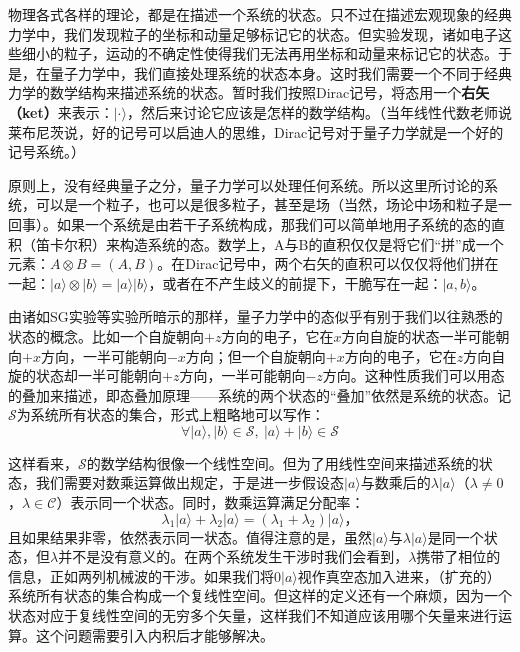 \documentclass{ctexart}
\begin{document}
物理各式各样的理论，都是在描述一个系统的状态。只不过在描述宏观现象的经典力学中，我们发现粒子的坐标和动量足够标记它的状态。但实验发现，诸如电子这些细小的粒子，运动的不确定性使得我们无法再用坐标和动量来标记它的状态。于是，在量子力学中，我们直接处理系统的状态本身。这时我们需要一个不同于经典力学的数学结构来描述系统的状态。暂时我们按照Dirac记号，将态用一个\textbf{右矢（ket）}来表示：$|\cdot\rangle$，然后来讨论它应该是怎样的数学结构。（当年线性代数老师说莱布尼茨说，好的记号可以启迪人的思维，Dirac记号对于量子力学就是一个好的记号系统。）

原则上，没有经典量子之分，量子力学可以处理任何系统。所以这里所讨论的系统，可以是一个粒子，也可以是很多粒子，甚至是场（当然，场论中场和粒子是一回事）。如果一个系统是由若干子系统构成，那我们可以简单地用子系统的态的直积（笛卡尔积）来构造系统的态。数学上，A与B的直积仅仅是将它们“拼”成一个元素：$A\otimes B=(A,B)$。在Dirac记号中，两个右矢的直积可以仅仅将他们拼在一起：$|a\rangle\otimes |b\rangle=|a\rangle|b\rangle$，或者在不产生歧义的前提下，干脆写在一起：$|a,b\rangle$。

由诸如SG实验等实验所暗示的那样，量子力学中的态似乎有别于我们以往熟悉的状态的概念。比如一个自旋朝向$+z$方向的电子，它在$x$方向自旋的状态一半可能朝向$+x$方向，一半可能朝向$-x$方向；但一个自旋朝向$+x$方向的电子，它在$z$方向自旋的状态却一半可能朝向$+z$方向，一半可能朝向$-z$方向。这种性质我们可以用态的叠加来描述，即态叠加原理——系统的两个状态的“叠加”依然是系统的状态。记$\mathcal{S}$为系统所有状态的集合，形式上粗略地可以写作：
\begin{equation}
\forall |a\rangle, |b\rangle\in\mathcal{S},\  |a\rangle+|b\rangle\in\mathcal{S}
\end{equation}

这样看来，$\mathcal{S}$的数学结构很像一个线性空间。但为了用线性空间来描述系统的状态，我们需要对数乘运算做出规定，于是进一步假设态$|a\rangle$与数乘后的$\lambda|a\rangle$（$\lambda\neq 0$，$\lambda\in\mathcal{C}$）表示同一个状态。同时，数乘运算满足分配率：
\begin{equation}
\lambda_1|a\rangle+\lambda_2|a\rangle=(\lambda_1+\lambda_2)|a\rangle，
\end{equation}
且如果结果非零，依然表示同一状态。值得注意的是，虽然$|a\rangle$与$\lambda|a\rangle$是同一个状态，但$\lambda$并不是没有意义的。在两个系统发生干涉时我们会看到，$\lambda$携带了相位的信息，正如两列机械波的干涉。如果我们将$0|a\rangle$视作真空态加入进来，（扩充的）系统所有状态的集合构成一个复线性空间。但这样的定义还有一个麻烦，因为一个状态对应于复线性空间的无穷多个矢量，这样我们不知道应该用哪个矢量来进行运算。这个问题需要引入内积后才能够解决。
\end{document}
